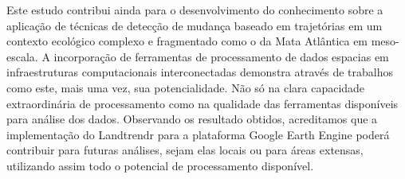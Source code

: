 Este estudo contribui ainda para o desenvolvimento do conhecimento sobre a aplicação de técnicas de detecção de mudança baseado em trajetórias em um contexto ecológico complexo e fragmentado como o da Mata Atlântica em meso-escala. A incorporação de ferramentas de processamento de dados espacias em infraestruturas computacionais interconectadas demonstra através de trabalhos como este, mais uma vez, sua potencialidade. Não só na clara capacidade extraordinária de processamento como na qualidade das ferramentas disponíveis para análise dos dados. Observando os resultado obtidos, acreditamos que a implementação do Landtrendr para a plataforma Google Earth Engine poderá contribuir para futuras análises, sejam elas locais ou para áreas extensas, utilizando assim todo o potencial de processamento disponível.
